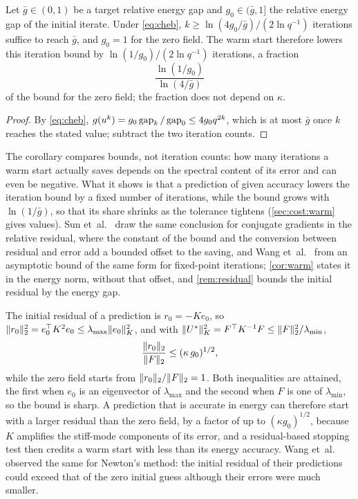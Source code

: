 \begin{corollary}\label{cor:warm}
Let $\bar g\in(0,1)$ be a target relative energy gap and $g_0\in(\bar g,1]$ the relative
energy gap of the initial iterate. Under \eqref{eq:cheb}, $k\ge\ln(4g_0/\bar g)/(2\ln
q^{-1})$
iterations suffice to reach $\bar g$, and $g_0=1$ for the zero field. The warm start
therefore lowers this iteration bound by $\ln(1/g_0)/(2\ln q^{-1})$ iterations, a fraction
\begin{equation}
\frac{\ln(1/g_0)}{\ln(4/\bar g)}
\label{eq:warm}
\end{equation}
of the bound for the zero field; the fraction does not depend on $\kappa$.
\end{corollary}

\begin{proof}
By \eqref{eq:cheb}, $g(u^k)=g_0\operatorname{gap}_k/\operatorname{gap}_0\le4g_0q^{2k}$, which is at most $\bar g$
once $k$ reaches the stated value; subtract the two iteration counts.
\end{proof}

The corollary compares bounds, not iteration counts: how many iterations a warm start
actually saves depends on the spectral content of its error and can even be negative. What
it shows is that a prediction of given accuracy lowers the iteration bound by a fixed number
of iterations, while the bound grows with $\ln(1/\bar g)$, so that its share shrinks as the
tolerance tightens (\cref{sec:cost:warm} gives values). Sun et~al.~\cite{Sun2026FEVessel}
draw the same conclusion for conjugate gradients in the relative residual, where the
constant of the bound and the conversion between residual and error add a bounded offset to
the saving, and Wang
et~al.~\cite{Wang2026PretrainFEM} from an asymptotic bound of the same form for fixed-point
iterations; \cref{cor:warm} states it in the energy norm, without that offset, and
\cref{rem:residual} bounds the initial residual by the energy gap.

\begin{remark}\label{rem:residual}
The initial residual of a prediction is $r_0=-Ke_0$, so
$\lVert r_0\rVert_2^2=e_0^{\top}K^2e_0\le\lambda_{\max}\lVert e_0\rVert_K^2$, and with
$\lVert U^{\ast}\rVert_K^2=F^{\top}K^{-1}F\le\lVert F\rVert_2^2/\lambda_{\min}$,
\begin{equation}
\frac{\lVert r_0\rVert_2}{\lVert F\rVert_2} \le (\kappa\,g_0)^{1/2},
\label{eq:residual}
\end{equation}
while the zero field starts from $\lVert r_0\rVert_2/\lVert F\rVert_2=1$. Both inequalities are
attained,
the first when $e_0$ is an eigenvector of $\lambda_{\max}$ and the second when $F$ is one
of $\lambda_{\min}$, so the bound is sharp. A prediction that is accurate in energy can
therefore start with a larger residual than the zero field, by a factor of up to
$(\kappa g_0)^{1/2}$, because $K$ amplifies the stiff-mode components of its error, and a
residual-based stopping test then credits a warm start with less than its energy accuracy.
Wang et~al.~\cite{Wang2026PretrainFEM} observed the same for Newton's method: the initial
residual of their predictions could exceed that of the zero initial guess although their
errors were much smaller.
\end{remark}
